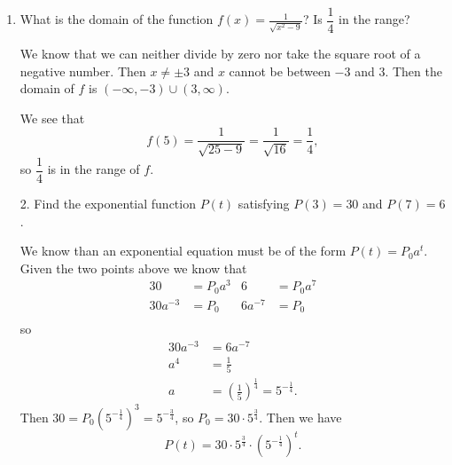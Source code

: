 \documentclass[11pt]{article}
\begin{document}
\pagestyle{empty}
\newsavebox{\quizfront}
\begin{lrbox}{\quizfront}
\begin{minipage}[top][3.5in][t]{\textwidth} \setlength{\parindent}{1.5em}
\drawtitle
\vspace{-0.5in}
\begin{enumerate}

\item What is the domain of the function
  $f(x)=\displaystyle\frac{1}{\sqrt{x^2-9}}$? Is $\dfrac{1}{4}$ in the
  range?

  \vfill \color{blue} We know that we can neither divide by zero nor
  take the square root of a negative number.  Then $x\neq \pm 3$ and
  $x$ cannot be between $-3$ and $3$.  Then the domain of $f$ is
  $(-\infty, -3) \cup (3,\infty)$.

  We see that
  \[
  f(5) = \frac{1}{\sqrt{25-9}} = \frac{1}{\sqrt{16}} = \frac{1}{4},
  \]
  so $\dfrac{1}{4}$ is in the range of $f$.

  \vfill

\end{enumerate}



\end{minipage}
\end{lrbox}

\newsavebox{\quizback}
\begin{lrbox}{\quizback}
\begin{minipage}[top][5.5in][t]{\textwidth} \setlength{\parindent}{1.5em}
\begin{itemize}
\item[2.] Find the exponential function $P(t)$ satisfying $P(3) = 30$
  and $P(7) = 6$.

\vfill
\color{blue} We know than an exponential equation must be of the form $P(t) = P_0 a^t$.  Given the two points above we know that
\begin{align*}
  30 &= P_0 a^3 & 6 &= P_0 a^7\\
  30a^{-3} &= P_0  & 6a^{-7} &= P_0\\
\end{align*}
so
\begin{align*}
  30 a^{-3} &= 6a^{-7}\\
  a^4 &= \frac{1}{5}\\
  a &= \left(\frac{1}{5}\right)^{\frac{1}{4}} = 5^{-\frac{1}{4}}.
\end{align*}
Then $\displaystyle 30 =
P_0\left(5^{-\frac{1}{4}}\right)^3=5^{-\frac{3}{4}}$, so $P_0 =
30\cdot 5^{\frac{3}{4}}$.  Then we have
\[
P(t) = 30\cdot 5^{\frac{3}{4}}\cdot\left(5^{-\frac{1}{4}}\right)^t.
\]

\vfill


\end{itemize}
\end{minipage}
\end{lrbox}
\end{document}
